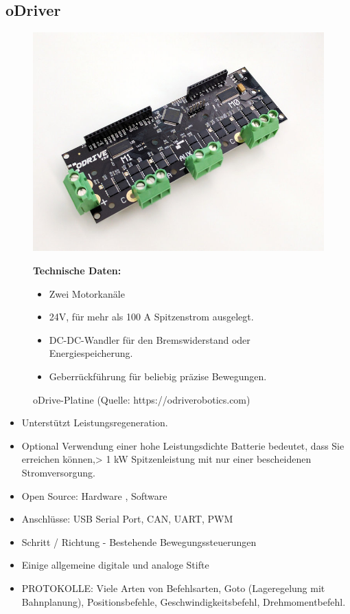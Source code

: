\subsection{oDriver}
\begin{figure}[htb]
	\centering
	\begin{minipage}{0.38\linewidth}
		\centering
		\includegraphics[scale=0.2]{images/odrive.jpeg}
		\caption{oDrive-Platine  \newline (Quelle: https://odriverobotics.com)}
		\label{odrive}
	\end{minipage}
 \begin{minipage}[h]{0.6\textwidth}
	\textbf{Technische Daten:} 
	\begin{itemize} 
		\item Zwei Motorkanäle
		\item 24V, für mehr als 100 A Spitzenstrom ausgelegt.
		\item DC-DC-Wandler für den Bremswiderstand oder Energiespeicherung.
		\item Geberrückführung für beliebig präzise Bewegungen.
	\end{itemize}
\end{minipage}
\end{figure}

\begin{itemize} 
\item Unterstützt Leistungsregeneration.
\item Optional Verwendung einer hohe Leistungsdichte Batterie bedeutet, dass Sie erreichen können,> 1 kW Spitzenleistung mit nur einer bescheidenen Stromversorgung.
\item Open Source: Hardware , Software
\item Anschlüsse: USB Serial Port, CAN, UART, PWM
\item Schritt / Richtung - Bestehende Bewegungssteuerungen
\item Einige allgemeine digitale und analoge Stifte
\item PROTOKOLLE: Viele Arten von Befehlsarten, 
Goto (Lageregelung mit Bahnplanung), 
Positionsbefehle, 
Geschwindigkeitsbefehl, 
Drehmomentbefehl.
\end{itemize}

